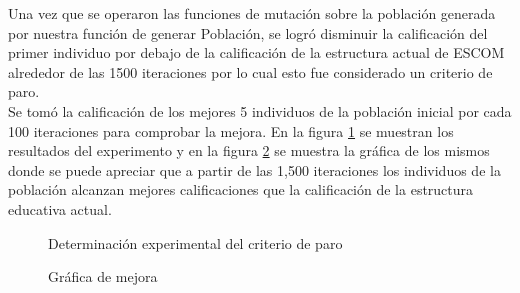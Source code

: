 Una vez que se operaron las funciones de mutación sobre la población generada por nuestra función de generar Población, se logró disminuir la calificación del primer individuo por debajo de la calificación de la estructura actual de ESCOM alrededor de las 1500 iteraciones por lo cual esto fue considerado un criterio de paro.\\


Se tomó la calificación de los mejores 5 individuos de la población inicial por cada 100 iteraciones para comprobar la mejora. En la figura \ref{fig:PruebaV4} se muestran los resultados del experimento y en la figura \ref{fig:grafV4} se muestra la gráfica de los mismos donde se puede apreciar que a partir de las 1,500 iteraciones los individuos de la población alcanzan mejores calificaciones que la calificación de la estructura educativa actual.\\
 
 \begin{figure}[htbp!]
 	\begin{center}
 		\caption{Determinación experimental del criterio de paro}
 		\label{fig:PruebaV4}
 	\end{center}
 \end{figure}


\begin{figure}[htbp!]
	\begin{center}
		\caption{Gráfica de mejora}
		\label{fig:grafV4}
	\end{center}
\end{figure}

